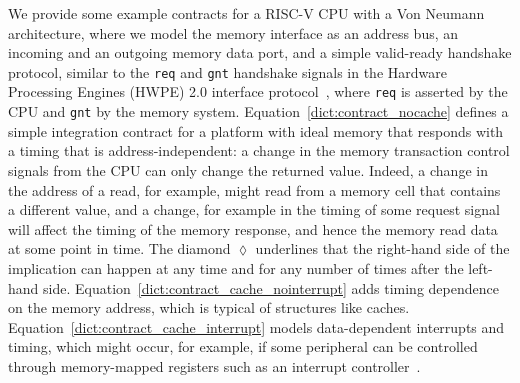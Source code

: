 We provide some example contracts for a RISC-V CPU with a Von Neumann architecture, where we model the memory interface as an address bus, an incoming and an outgoing memory data port, and a simple valid-ready handshake protocol, similar to the \texttt{req} and \texttt{gnt} handshake signals in the Hardware Processing Engines (HWPE) 2.0 interface protocol~\cite{pulpHWPEMem}, where \texttt{req} is asserted by the CPU and \texttt{gnt} by the memory system.
Equation~\ref{dict:contract_nocache} defines a simple integration contract for a platform with ideal memory that responds with a timing that is address-independent: a change in the memory transaction control signals from the CPU can only change the returned value.
Indeed, a change in the address of a read, for example, might read from a memory cell that contains a different value, and a change, for example in the timing of some request signal will affect the timing of the memory response, and hence the memory read data at some point in time.
The diamond $\lozenge$ underlines that the right-hand side of the implication can happen at any time and for any number of times after the left-hand side.
Equation~\ref{dict:contract_cache_nointerrupt} adds timing dependence on the memory address, which is typical of structures like caches.
Equation~\ref{dict:contract_cache_interrupt} models data-dependent interrupts and timing, which might occur, for example, if some peripheral can be controlled through memory-mapped registers such as an interrupt controller~\cite{riscv_plic_spec_1_0_0}.

